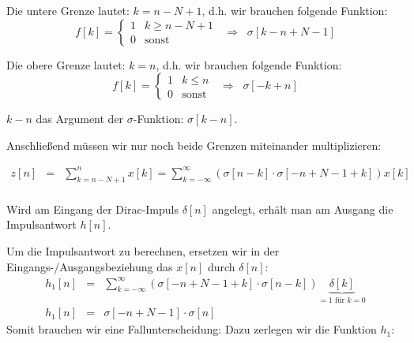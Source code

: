 \begin{uebsp}
\begin{Answer}
\begin{enumerate}[a)]
\begin{enumerate}
                Die untere Grenze lautet: $k=n-N+1$, d.h. wir brauchen folgende
                Funktion: 
                \[f[k]=\begin{cases}1&k\geq n-N+1\\0&\text{
                    sonst}\end{cases}\;\;\Rightarrow\;\;\sigma[k-n+N-1]\]

                Die obere Grenze lautet: $k=n$, d.h. wir brauchen folgende
                Funktion:
                \[f[k]=\begin{cases}1&k\leq n\\0&\text{
                    sonst}\end{cases}\;\;\Rightarrow\;\;\sigma[-k+n]\]

                $k-n$ das Argument der $\sigma$-Funktion:
                $\sigma[k-n]$.

                Anschließend müssen wir nur noch beide Grenzen miteinander
                multiplizieren:

                \begin{eqnarray*}
                    z[n]&=&\sum_{k=n-N+1}^nx[k]=
                        \sum_{k=-\infty}^\infty(\sigma[n-k]\cdot\sigma[-n+N-1+k])x[k]\\
                \end{eqnarray*}

                \begin{uebsp_theory}
                    Wird am Eingang der Dirac-Impuls $\delta[n]$ angelegt,
                    erhält man am Ausgang die Impulsantwort $h[n]$.
                \end{uebsp_theory}

                Um die Impulsantwort zu berechnen, ersetzen wir in der
                Eingangs-/Ausgangsbeziehung das $x[n]$ durch $\delta[n]$:
                \begin{eqnarray*}
                    h_1[n]&=&\sum_{k=-\infty}^\infty(\sigma[-n+N-1+k]\cdot\sigma[n-k])
                        \underbrace{\delta[k]}_{=1\text{ für }k=0}\\
                    h_1[n]&=&\sigma[-n+N-1]\cdot \sigma[n]
                \end{eqnarray*}
                Somit brauchen wir eine Fallunterscheidung: Dazu zerlegen wir
                die Funktion $h_1$:


\end{enumerate}
\end{enumerate}
\end{Answer}
\end{uebsp}
